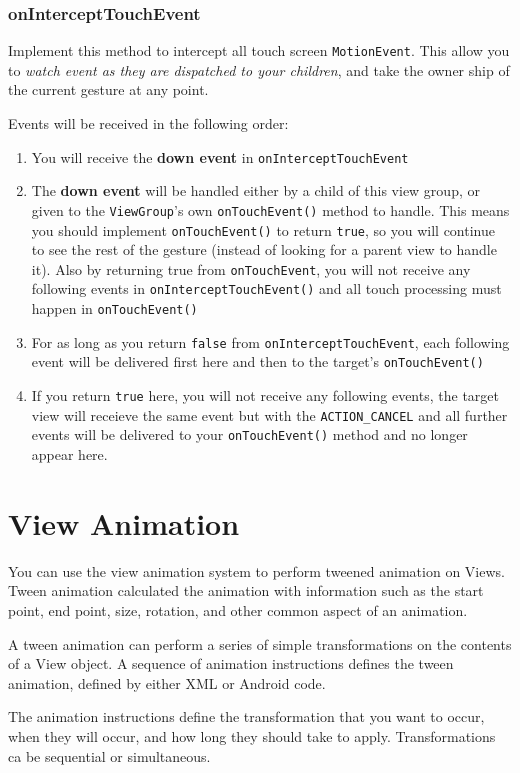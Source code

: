 \documentclass[11pt, a4paper]{book}
\begin{document}
\subsection{onInterceptTouchEvent}
Implement this method to intercept all touch screen \verb|MotionEvent|. This
allow you to \emph{watch event as they are dispatched to your children}, and
take the owner ship of the current gesture at any point.

Events will be received in the following order:
\begin{enumerate}
\item You will receive the \textbf{down event} in \verb|onInterceptTouchEvent|
\item The \textbf{down event} will be handled either by a child of this view
group, or given to the \verb|ViewGroup|'s own \verb|onTouchEvent()| method to
handle. This means you should implement \verb|onTouchEvent()| to return
\verb|true|, so you will continue to see the rest of the gesture (instead of
looking for a parent view to handle it). Also by returning true from
\verb|onTouchEvent|, you will not receive any following events in
\verb|onInterceptTouchEvent()| and all touch processing must happen in
\verb|onTouchEvent()|
\item For as long as you return \verb|false| from \verb|onInterceptTouchEvent|,
each following event will be delivered first here and then to the target's
\verb|onTouchEvent()|
\item If you return \verb|true| here, you will not receive any following events,
the target view will receieve the same event but with the \verb|ACTION_CANCEL|
and all further events will be delivered to your \verb|onTouchEvent()| method
and no longer appear here.
\end{enumerate}

\chapter{View Animation}
You can use the view animation system to perform tweened animation on Views.
Tween animation calculated the animation with information such as the start
point, end point, size, rotation, and other common aspect of an animation.

A tween animation can perform a series of simple transformations on the contents
of a View object. A sequence of animation instructions defines the tween
animation, defined by either XML or Android code.  

The animation instructions define the transformation that you want to occur,
when they will occur, and how long they should take to apply. Transformations ca
be sequential or simultaneous.
\end{document}
